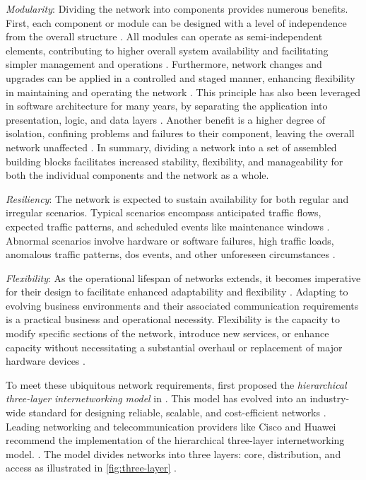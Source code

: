 \textit{Modularity}:
Dividing the network into components provides numerous benefits.
First, each component or module can be designed with a level of independence
    from the overall structure \cite{cisco_net_size}.
All modules can operate as semi-independent elements, contributing to higher
    overall system availability and facilitating simpler management and
    operations \cite{cisco_campus_net}.
Furthermore, network changes and upgrades can be applied in a controlled and
    staged manner, enhancing flexibility in maintaining and operating the
    network \cite{cisco_net_size}.
This principle has also been leveraged in software architecture for many years,
    by separating the application into presentation, logic, and data layers
    \cite{sw_arch}.
Another benefit is a higher degree of isolation, confining problems and
    failures to their component, leaving the overall network unaffected
    \cite{cisco_design_guide}.
In summary, dividing a network into a set of assembled building blocks
    facilitates increased stability, flexibility, and manageability for both
    the individual components and the network as a whole.
    \cite{cisco_campus_net}

\textit{Resiliency}: The network is expected to sustain availability for both
    regular and irregular scenarios.
Typical scenarios encompass anticipated traffic flows, expected traffic
    patterns, and scheduled events like maintenance windows
    \cite{cisco_net_size}.
Abnormal scenarios involve hardware or software failures, high traffic loads,
    anomalous traffic patterns, \gls{dos} events, and other unforeseen
    circumstances \cite{cisco_campus_net}.

\textit{Flexibility}:
As the operational lifespan of networks extends, it becomes imperative for
    their design to facilitate enhanced adaptability and flexibility
    \cite{cisco_campus_net}.
Adapting to evolving business environments and their associated communication
    requirements is a practical business and operational necessity.
Flexibility is the capacity to modify specific sections of the network,
    introduce new services, or enhance capacity without necessitating a
    substantial overhaul or replacement of major hardware devices
    \cite{cisco_net_size}.

To meet these ubiquitous network requirements, \citeauthor{cisco_3_tier}
    \cite{cisco_3_tier} first proposed the \textit{hierarchical three-layer
    internetworking model} in \citeyear{cisco_3_tier}.
This model has evolved into an industry-wide standard for designing reliable,
    scalable, and cost-efficient networks \cite{cisco_net_size}.
Leading networking and telecommunication providers like Cisco and Huawei
    recommend the implementation of the hierarchical three-layer
    internetworking model.
    \cite{cisco_campus_net,huawei_campus_net}.
The model divides networks into three layers: core, distribution, and access
    as illustrated in \autoref{fig:three-layer} \cite{cisco_3_tier}.

